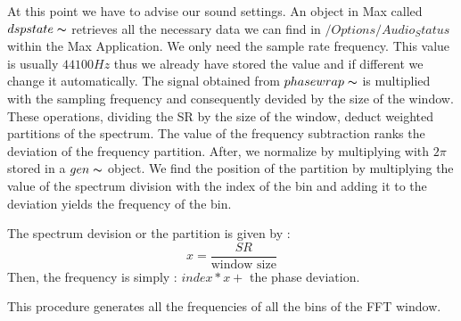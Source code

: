At this point we have to advise our sound settings. An object in Max called $dspstate\thicksim$ retrieves all the necessary data we can find in $/Options/Audio_Status$ within the Max Application. We only need the sample rate frequency. This value is usually $44100Hz$ thus we already have stored the value and if different we change it automatically. The signal obtained from $phasewrap\thicksim$ is multiplied with the sampling frequency and consequently devided by the size of the window. These operations, dividing the SR by the size of the window, deduct weighted partitions of the spectrum. The value of the frequency subtraction ranks the deviation of the frequency partition. After, we normalize by multiplying with $2\pi$ stored in a $gen\thicksim$ object. We find the position of the partition by multiplying the value of the spectrum division with the index of the bin and adding it to the deviation yields the frequency of the bin.

The spectrum devision or the partition is given by :
    \begin{equation*}
        x = \frac{SR}{\text{window size}}
    \end{equation*}
Then, the frequency is simply : $index * x + $ the phase deviation.

This procedure generates all the frequencies of all the bins of the FFT window.




